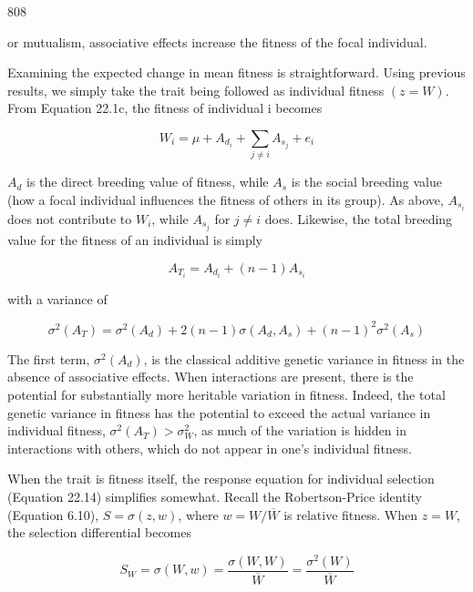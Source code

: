 \documentclass{article}
\begin{document}
808

or mutualism, associative effects increase the fitness of the focal individual.

Examining the expected change in mean fitness is straightforward. Using previous results, we simply take the trait being followed as individual fitness  $ (z = W) $. From Equation 22.1c, the fitness of individual i becomes

\begin{equation}
W_{i}=\mu+A_{d_{i}}+\sum_{j\neq i}A_{s_{j}}+e_{i}
\tag{22.47a}
\label{eq:22_47a}
\end{equation}

 $ A_{d} $ is the direct breeding value of fitness, while  $ A_{s} $ is the social breeding value (how a focal individual influences the fitness of others in its group). As above,  $ A_{s_{i}} $ does not contribute to  $ W_{i} $, while  $ A_{s_{j}} $ for  $ j \neq i $ does. Likewise, the total breeding value for the fitness of an individual is simply

\begin{equation}
A_{T_{i}}=A_{d_{i}}+(n-1)A_{s_{i}}
\tag{22.47b}
\label{eq:22_47b}
\end{equation}

with a variance of

\begin{equation}
\sigma^{2}(A_{T})=\sigma^{2}(A_{d})+2(n-1)\sigma(A_{d},A_{s})+(n-1)^{2}\sigma^{2}(A_{s})
\tag{22.47c}
\label{eq:22_47c}
\end{equation}

The first term,  $ \sigma^2(A_d) $, is the classical additive genetic variance in fitness in the absence of associative effects. When interactions are present, there is the potential for substantially more heritable variation in fitness. Indeed, the total genetic variance in fitness has the potential to exceed the actual variance in individual fitness,  $ \sigma^2(A_T) > \sigma_W^2 $, as much of the variation is hidden in interactions with others, which do not appear in one's individual fitness.

When the trait is fitness itself, the response equation for individual selection (Equation 22.14) simplifies somewhat. Recall the Robertson-Price identity (Equation 6.10),  $ S = \sigma(z, w) $, where  $ w = W/\overline{W} $ is relative fitness. When  $ z = W $, the selection differential becomes

\begin{equation}
S_{W}=\sigma(W,w)=\frac{\sigma(W,W)}{\overline{W}}=\frac{\sigma^{2}(W)}{\overline{W}}
\tag{22.48a}
\label{eq:22_48a}
\end{equation}
\end{document}
